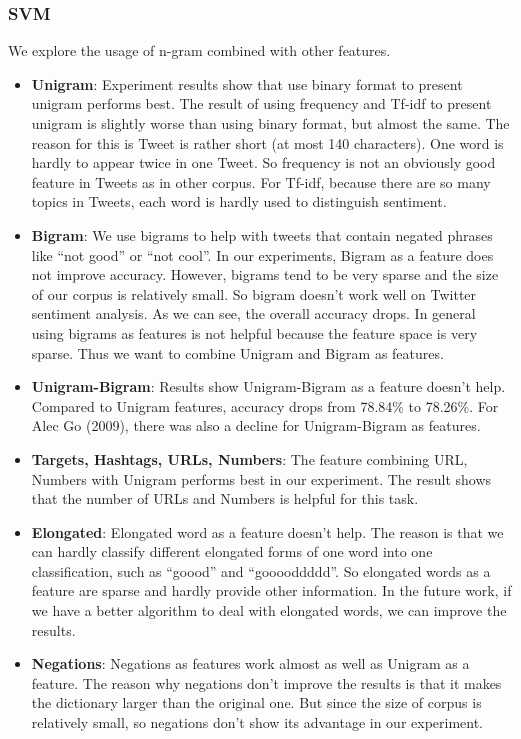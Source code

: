 \subsubsection{SVM}
We explore the usage of n-gram combined with other features. 
\begin{itemize}
\item \textbf{Unigram}: Experiment results show that use binary format to present unigram performs best. The result of using frequency and Tf-idf to present unigram is slightly worse than using binary format, but almost the same. The reason for this is Tweet is rather short (at most 140 characters). One word is hardly to appear twice in one Tweet. So frequency is not an obviously good feature in Tweets as in other corpus. For Tf-idf, because there are so many topics in Tweets, each word is hardly used to distinguish sentiment.

\item \textbf{Bigram}: We use bigrams to help with tweets that contain negated phrases like “not good” or “not cool”. In our experiments, Bigram as a feature does not improve accuracy. However, bigrams tend to be very sparse and the size of our corpus is relatively small. So bigram doesn’t work well on Twitter sentiment analysis. As we can see, the overall accuracy drops. In general using bigrams as features is not helpful because the feature space is very sparse. Thus we want to combine Unigram and Bigram as features. 

\item \textbf{Unigram-Bigram}: Results show Unigram-Bigram as a feature doesn’t help. Compared to Unigram features, accuracy drops from 78.84\% to 78.26\%. For Alec Go (2009), there was also a decline for Unigram-Bigram as features. 

\item \textbf{Targets, Hashtags, URLs, Numbers}: The feature combining URL, Numbers with Unigram performs best in our experiment. The result shows that the number of URLs and Numbers is helpful for this task. 

\item \textbf{Elongated}:  Elongated word as a feature doesn’t help. The reason is that we can hardly classify different elongated forms of one word into one classification, such as “goood” and “gooooddddd”. So elongated words as a feature are sparse and hardly provide other information. In the future work, if we have a better algorithm to deal with elongated words, we can improve the results. 

\item \textbf{Negations}: Negations as features work almost as well as Unigram as a feature. The reason why negations don’t improve the results is that it makes the dictionary larger than the original one. But since the size of corpus is relatively small, so negations don’t show its advantage in our experiment. 

\end{itemize}







